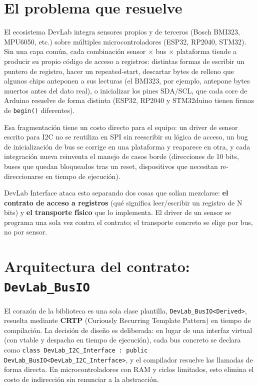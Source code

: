 \documentclass[11pt,a4paper]{article}
\newcommand{\code}[1]{\texttt{\small #1}}
\begin{document}
\section*{El problema que resuelve}

El ecosistema DevLab integra sensores propios y de terceros (Bosch BMI323, MPU6050, etc.) sobre múltiples microcontroladores (ESP32, RP2040, STM32). Sin una capa común, cada combinación sensor \(\times\) bus \(\times\) plataforma tiende a producir su propio código de acceso a registros: distintas formas de escribir un puntero de registro, hacer un repeated-start, descartar bytes de relleno que algunos chips anteponen a sus lecturas (el BMI323, por ejemplo, antepone bytes muertos antes del dato real), o inicializar los pines SDA/SCL, que cada core de Arduino resuelve de forma distinta (ESP32, RP2040 y STM32duino tienen firmas de \code{begin()} diferentes).

Esa fragmentación tiene un costo directo para el equipo: un driver de sensor escrito para I2C no se reutiliza en SPI sin reescribir su lógica de acceso, un bug de inicialización de bus se corrige en una plataforma y reaparece en otra, y cada integración nueva reinventa el manejo de casos borde (direcciones de 10 bits, buses que quedan bloqueados tras un reset, dispositivos que necesitan re-direccionarse en tiempo de ejecución).

DevLab Interface ataca esto separando dos cosas que solían mezclarse: \textbf{el contrato de acceso a registros} (qué significa leer/escribir un registro de N bits) y \textbf{el transporte físico} que lo implementa. El driver de un sensor se programa una sola vez contra el contrato; el transporte concreto se elige por bus, no por sensor.

\section*{Arquitectura del contrato: \code{DevLab\_BusIO}}

El corazón de la biblioteca es una sola clase plantilla, \code{DevLab\_BusIO<Derived>}, resuelta mediante \textbf{CRTP} (Curiously Recurring Template Pattern) en tiempo de compilación. La decisión de diseño es deliberada: en lugar de una interfaz virtual (con vtable y despacho en tiempo de ejecución), cada bus concreto se declara como \code{class DevLab\_I2C\_Interface : public DevLab\_BusIO<DevLab\_I2C\_Interface>}, y el compilador resuelve las llamadas de forma directa. En microcontroladores con RAM y ciclos limitados, esto elimina el costo de indirección sin renunciar a la abstracción.
\end{document}
